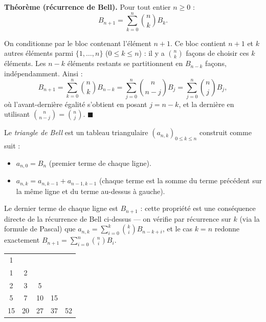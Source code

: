 
\begin{tcolorbox}[thmbox]
  \textbf{Théorème (récurrence de Bell).}\enspace{}
  Pour tout entier $n \geq 0$ :
  \[
    B_{n+1} = \sum_{k=0}^{n} \binom{n}{k} B_k.
  \]
\end{tcolorbox}


\begin{mdframed}[style=proofbar]
  On conditionne par le bloc contenant l'élément $n+1$.
  Ce bloc contient $n+1$ et $k$ autres éléments parmi $\{1,\ldots,n\}$
  ($0 \leq k \leq n$) : il y a $\binom{n}{k}$ façons de choisir ces $k$
  éléments. Les $n-k$ éléments restants se partitionnent en $B_{n-k}$ façons,
  indépendamment. Ainsi :
  \[
    B_{n+1} = \sum_{k=0}^{n} \binom{n}{k} B_{n-k}
             = \sum_{j=0}^{n} \binom{n}{n-j} B_j
             = \sum_{j=0}^{n} \binom{n}{j} B_j,
  \]
  où l'avant-dernière égalité s'obtient en posant $j=n-k$, et la dernière
  en utilisant $\binom{n}{n-j}=\binom{n}{j}$.
  $\blacksquare$
\end{mdframed}


\begin{mdframed}[style=exbar]
  Le \emph{triangle de Bell} est un tableau triangulaire $(a_{n,k})_{0\leq k\leq n}$
  construit comme suit :
  \begin{itemize}
    \item $a_{n,0} = B_n$ (premier terme de chaque ligne).
    \item $a_{n,k} = a_{n,k-1} + a_{n-1,k-1}$ (chaque terme est la somme du
          terme précédent sur la même ligne et du terme au-dessus à gauche).
  \end{itemize}
  Le dernier terme de chaque ligne est $B_{n+1}$ : cette propriété est une
  conséquence directe de la récurrence de Bell ci-dessus — on vérifie par
  récurrence sur $k$ (via la formule de Pascal) que
  $a_{n,k} = \sum_{i=0}^{k}\binom{k}{i}B_{n-k+i}$, et le cas $k=n$ redonne
  exactement $B_{n+1} = \sum_{i=0}^{n}\binom{n}{i}B_i$.

  \medskip
  \begin{center}
    \begin{tabular}{ccccc}
      1 & & & & \\
      1 & 2 & & & \\
      2 & 3 & 5 & & \\
      5 & 7 & 10 & 15 & \\
      15 & 20 & 27 & 37 & 52 \\
    \end{tabular}
  \end{center}
\end{mdframed}

